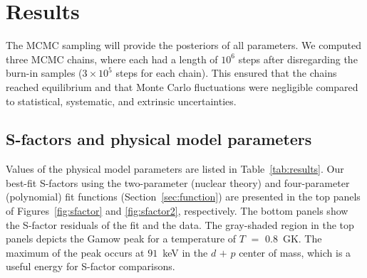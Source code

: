 \documentclass[twocolumn]{aastex63}
\begin{document}
\section{Results} 
\label{sec:results}


The MCMC sampling will provide the posteriors of all parameters. We computed three MCMC chains, where each had a length of $10^6$ steps after disregarding the burn-in samples ($3\times 10^5$ steps for each chain). This ensured that the chains reached equilibrium and that Monte Carlo fluctuations were negligible compared to statistical, systematic, and extrinsic uncertainties.

\subsection{S-factors and physical model parameters} 
\label{sec:sfac}
Values of the physical model parameters are listed in Table~\ref{tab:results}. Our best-fit S-factors using the two-parameter (nuclear theory) and four-parameter (polynomial) fit functions (Section~\ref{sec:function}) are presented in the top panels of Figures~\ref{fig:sfactor} and \ref{fig:sfactor2}, respectively. The bottom panels show the S-factor residuals of the fit and the data. The gray-shaded region in the top panels depicts the Gamow peak for a temperature of $T$ $=$ $0.8$~GK. The maximum of the peak occurs at $91$~keV in the $d$ $+$ $p$ center of mass, which is a useful energy for S-factor comparisons. 
\end{document}
